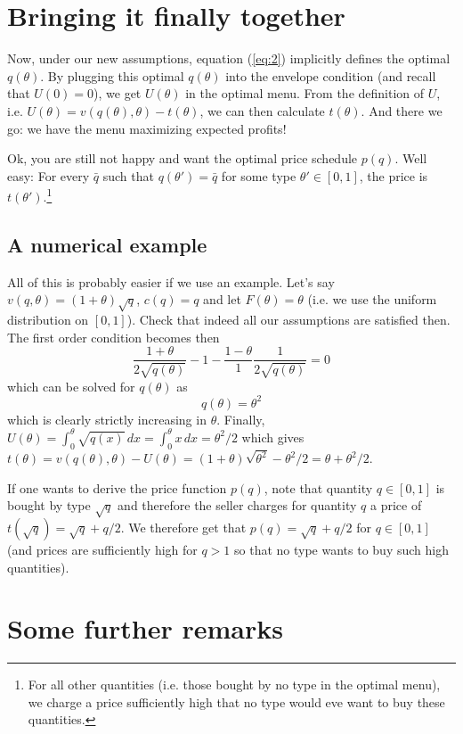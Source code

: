 \documentclass[12pt]{article}
\begin{document}
\section{Bringing it finally together}
\label{sec:bringing-it-finally}

Now, under our new assumptions, equation (\ref{eq:2}) implicitly defines the optimal $q(\theta )$. By plugging this optimal $q(\theta )$ into the envelope condition (and recall that $U(0)=0$), we get $U(\theta )$ in the optimal menu. From the definition of $U$, i.e. $U(\theta )=v(q(\theta ),\theta )-t(\theta )$, we can then calculate $t(\theta )$. And there we go: we have the menu maximizing expected profits!

Ok, you are still not happy and want the optimal price schedule $p(q)$. Well easy: For every $\bar q$ such that $q(\theta' )=\bar q$ for some type $\theta' \in[0,1]$, the price is $t(\theta' )$.\footnote{For all other quantities (i.e. those bought by no type in the optimal menu), we charge a price sufficiently high that no type would eve want to buy these quantities.}

\subsection{A numerical example}
\label{sec:an-example}

All of this is probably easier if we use an example. Let's say $v(q,\theta )=(1+\theta )\sqrt{q}$, $c(q)=q$ and let $F(\theta )=\theta $ (i.e. we use the uniform distribution on $[0,1]$). Check that indeed all our assumptions are satisfied then. The first order condition becomes then
$$\frac{1+\theta }{2\sqrt{q(\theta )}}-1-\frac{1-\theta }{1}\frac{1}{2\sqrt{q(\theta) }}=0$$
which can be solved for $q(\theta )$ as
$$q(\theta )=\theta ^2$$
which is clearly strictly increasing in $\theta $. Finally, $U(\theta )=\int_0^\theta \sqrt{q(x)}\,dx=\int_0^\theta x\,dx=\theta ^2/2$ which gives $t(\theta )=v(q(\theta ),\theta )-U(\theta )=(1+\theta )\sqrt{\theta ^2}-\theta ^2/2=\theta +\theta ^2/2$.

If one wants to derive the price function $p(q)$, note that quantity $q\in[0,1]$ is bought by type $\sqrt{q }$ and therefore the seller charges for quantity $q$ a price of $t(\sqrt{q})=\sqrt{q}+q/2$. We therefore get that $p(q)=\sqrt{q}+q/2$ for $q\in[0,1]$ (and prices are sufficiently high for $q>1$ so that no type wants to buy such high quantities).

\section{Some further remarks}
\end{document}
